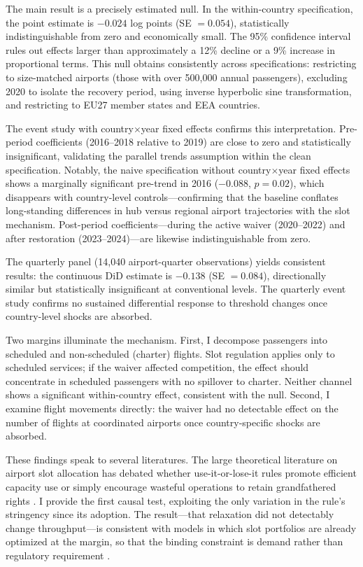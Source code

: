 \documentclass[12pt]{article}
\begin{document}
The main result is a precisely estimated null. In the within-country specification, the point estimate is $-0.024$ log points (SE $= 0.054$), statistically indistinguishable from zero and economically small. The 95\% confidence interval rules out effects larger than approximately a 12\% decline or a 9\% increase in proportional terms. This null obtains consistently across specifications: restricting to size-matched airports (those with over 500,000 annual passengers), excluding 2020 to isolate the recovery period, using inverse hyperbolic sine transformation, and restricting to EU27 member states and EEA countries.

The event study with country$\times$year fixed effects confirms this interpretation. Pre-period coefficients (2016--2018 relative to 2019) are close to zero and statistically insignificant, validating the parallel trends assumption within the clean specification. Notably, the naive specification without country$\times$year fixed effects shows a marginally significant pre-trend in 2016 ($-0.088$, $p = 0.02$), which disappears with country-level controls---confirming that the baseline conflates long-standing differences in hub versus regional airport trajectories with the slot mechanism. Post-period coefficients---during the active waiver (2020--2022) and after restoration (2023--2024)---are likewise indistinguishable from zero.

The quarterly panel (14,040 airport-quarter observations) yields consistent results: the continuous DiD estimate is $-0.138$ (SE $= 0.084$), directionally similar but statistically insignificant at conventional levels. The quarterly event study confirms no sustained differential response to threshold changes once country-level shocks are absorbed.

Two margins illuminate the mechanism. First, I decompose passengers into scheduled and non-scheduled (charter) flights. Slot regulation applies only to scheduled services; if the waiver affected competition, the effect should concentrate in scheduled passengers with no spillover to charter. Neither channel shows a significant within-country effect, consistent with the null. Second, I examine flight movements directly: the waiver had no detectable effect on the number of flights at coordinated airports once country-specific shocks are absorbed.

These findings speak to several literatures. The large theoretical literature on airport slot allocation \citep{brueckner2002, czerny2008, verhoef2010} has debated whether use-it-or-lose-it rules promote efficient capacity use or simply encourage wasteful operations to retain grandfathered rights \citep{starkie1998, grether2015}. I provide the first causal test, exploiting the only variation in the rule's stringency since its adoption. The result---that relaxation did not detectably change throughput---is consistent with models in which slot portfolios are already optimized at the margin, so that the binding constraint is demand rather than regulatory requirement \citep{brueckner2009}.
\end{document}
